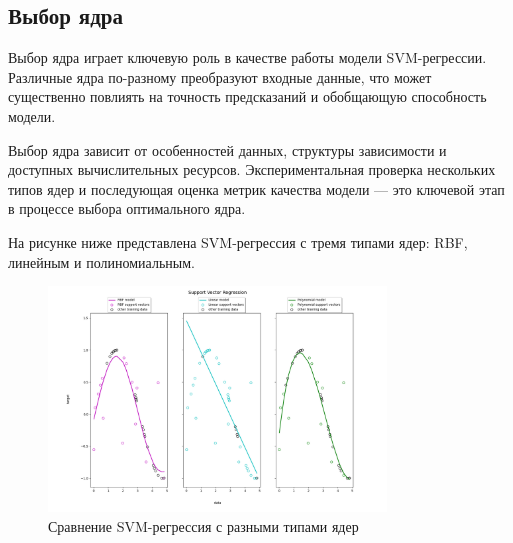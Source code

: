 \subsection{Выбор ядра}
\par Выбор ядра играет ключевую роль в качестве работы модели SVM-регрессии. Различные ядра по-разному преобразуют входные данные, что может существенно повлиять на точность предсказаний и обобщающую способность модели.
\par Выбор ядра зависит от особенностей данных, структуры зависимости и доступных вычислительных ресурсов. Экспериментальная проверка нескольких типов ядер и последующая оценка метрик качества модели — это ключевой этап в процессе выбора оптимального ядра.
\par На рисунке ниже представлена SVM-регрессия с тремя типами ядер: RBF, линейным и полиномиальным. 
\begin{figure}[ht!]
    \includegraphics[width = 0.8\textwidth]{chapters/svm/images/svm_regression_cmp_models.png}
    \centering
    \caption{Сравнение SVM-регрессия с разными типами ядер}
    \label{fig:kernel_comparison}
\end{figure}

